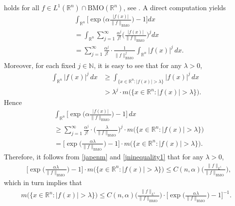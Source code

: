 \documentclass{birkjour}
\theoremstyle{definition}
\theoremstyle{remark}
\numberwithin{equation}{section}
\begin{document}
holds for all $f\in L^{1}(\mathbb R^n)\cap\mathrm{BMO}(\mathbb R^n)$, see \cite[Corollary 2.1]{Kozono2}. A direct computation yields
\begin{equation*}
\begin{split}
&\int_{\mathbb R^n}\bigg[\exp\Big(\alpha\frac{|f(x)|}{\|f\|_{\mathrm{BMO}}}\Big)-1\bigg]dx\\
&=\int_{\mathbb R^n}\sum_{j=1}^{\infty}\frac{\alpha^j}{j!}\bigg(\frac{|f(x)|}{\|f\|_{\mathrm{BMO}}}\bigg)^jdx\\
&=\sum_{j=1}^{\infty}\frac{\alpha^j}{j!}\cdot\frac{1}{\|f\|^j_{\mathrm{BMO}}}\int_{\mathbb R^n}|f(x)|^j\,dx.
\end{split}
\end{equation*}
Moreover, for each fixed $j\in \mathbb{N}$, it is easy to see that for any $\lambda>0$,
\begin{equation*}
\begin{split}
\int_{\mathbb R^n}|f(x)|^j\,dx&\geq\int_{\{x\in \mathbb R^n:|f(x)|>\lambda\}}|f(x)|^j\,dx\\
&>\lambda^j\cdot m\big(\big\{x\in \mathbb R^n:|f(x)|>\lambda\big\}\big).
\end{split}
\end{equation*}
Hence
\begin{equation}\label{jninequality1}
\begin{split}
&\int_{\mathbb R^n}\bigg[\exp\Big(\alpha\frac{|f(x)|}{\|f\|_{\mathrm{BMO}}}\Big)-1\bigg]\,dx\\
&\geq\sum_{j=1}^{\infty}\frac{\alpha^j}{j!}\cdot\bigg(\frac{\lambda}{\|f\|_{\mathrm{BMO}}}\bigg)^j
\cdot m\big(\big\{x\in \mathbb R^n:|f(x)|>\lambda\big\}\big)\\
&=\Big[\exp\Big(\frac{\alpha\lambda}{\|f\|_{\mathrm{BMO}}}\Big)-1\Big]
\cdot m\big(\big\{x\in \mathbb R^n:|f(x)|>\lambda\big\}\big).
\end{split}
\end{equation}
Therefore, it follows from \eqref{japenm} and \eqref{jninequality1} that for any $\lambda>0$,
\begin{equation*}
\begin{split}
&\Big[\exp\Big(\frac{\alpha\lambda}{\|f\|_{\mathrm{BMO}}}\Big)-1\Big]
\cdot m\big(\big\{x\in \mathbb R^n:|f(x)|>\lambda\big\}\big)
\leq C({n,\alpha})\bigg(\frac{\|f\|_{L^1}}{\|f\|_{\mathrm{BMO}}}\bigg),
\end{split}
\end{equation*}
which in turn implies that
\begin{equation*}
\begin{split}
m\big(\big\{x\in \mathbb R^n:|f(x)|>\lambda\big\}\big)
\leq C({n,\alpha})\bigg(\frac{\|f\|_{L^1}}{\|f\|_{\mathrm{BMO}}}\bigg)
\cdot\Big[\exp\Big(\frac{\alpha\lambda}{\|f\|_{\mathrm{BMO}}}\Big)-1\Big]^{-1}.
\end{split}
\end{equation*}
\end{document}
